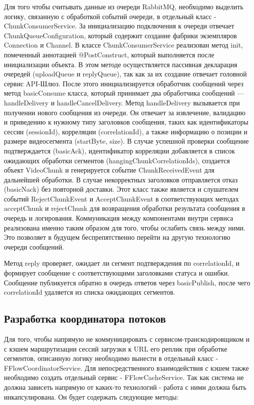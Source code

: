 	Для того чтобы считывать данные из очереди RabbitMQ, необходимо выделить логику, связанную с обработкой событий очереди, в отдельный класс - ChunkConsumerService. За инициализацию подключения к очереди отвечает ChunkQueueConfiguration, который содержит создание фабрики экземпляров Connection и Channel. В классе ChunkConsumerService реализован метод init, помеченный аннотацией @PostConstruct, который выполняется после инициализации объекта. В этом методе осуществляется пассивная декларация очередей (uploadQueue и replyQueue), так как за их создание отвечает головной сервис API-Шлюз. После этого инициализируется обработчик сообщений через метод basicConsume класса, который принимает два обработчика сообщений — handleDelivery и handleCancelDelivery. Метод handleDelivery вызывается при получении нового сообщения из очереди. Он отвечает за извлечение, валидацию и приведению к нужному типу заголовков сообщения, таких как идентификаторы сессии (sessionId), корреляции (correlationId), а также информацию о позиции и размере видеосегмента (startByte, size). В случае успешной проверки сообщение подтверждается (basicAck), идентификатор корреляции добавляется в список ожидающих обработки сегментов (hangingChunkCorrelationIds), создается объект VideoChunk и генерируется событие ChunkReceivedEvent для дальнейшей обработки. В случае некорректных заголовков отправляется отказ (basicNack) без повторной доставки. Этот класс также является и слушателем событий RejectChunkEvent и AcceptChunkEvent в соответствующих методах acceptChunk и rejectChunk для возвращения обработки результата сообщения в очередь и логирования. Коммуникация между компонентами внутри сервиса реализована именно таким образом для того, чтобы ослабить связь между ними. Это позволяет в будущем беспрепятственно перейти на другую технологию очереди сообщений.

	Метод reply проверяет, ожидает ли сегмент подтверждения по correlationId, и формирует сообщение с соответствующими заголовками статуса и ошибки. Сообщение публикуется обратно в очередь ответов через basicPublish, после чего correlationId удаляется из списка ожидающих сегментов.

	\subsection{Разработка координатора потоков}

	Для того, чтобы напрямую не коммуницировать с сервисом-транскодировщиком и с кэшем маршрутизации сессий загрузки к URL его реплик при обработке сегментов, описанную логику необходимо вынести в отдельный класс - FFlowCoordinatorService. Для непосредственного взаимодействия с кэшем также необходимо создать отдельный сервис - FFlowCacheService. Так как система не должна зависеть напрямую от каких-то технологий - работа с ними должна быть инкапсулирована. Он будет содержать следующие методы:

